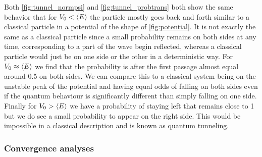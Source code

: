 Both \autoref{fig:tunnel_normpsi} and \autoref{fig:tunnel_probtrans} both show the same behavior that for $V_0<\langle E \rangle$ the particle mostly goes back and forth similar to a classical particle in a potential of the shape of \autoref{fig:potential}. It is not exactly the same as a classical particle since a small probability remains on both sides at any time, corresponding to a part of the wave begin reflected, whereas a classical particle would just be on one side or the other in a deterministic way. For $V_0 \approx \langle E \rangle$ we find that the probability is after the first passage almost equal around 0.5 on both sides. We can compare this to a classical system being on the unstable peak of the potential and having equal odds of falling on both sides even if the quantum behaviour is significantly different than simply falling on one side. Finally for $V_0>\langle E \rangle$ we have a probability of staying left that remains close to 1 but we do see a small probability to appear on the right side. This would be impossible in a classical description and is known as quantum tunneling.

\subsubsection{Convergence analyses}



